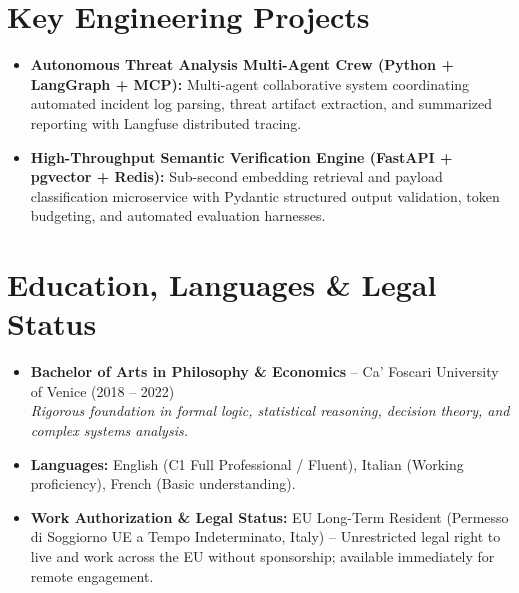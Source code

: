 \documentclass[a4paper,10pt]{article}
\begin{document}
\section{Key Engineering Projects}
\begin{itemize}
  \item \textbf{Autonomous Threat Analysis Multi-Agent Crew (Python + LangGraph + MCP):} Multi-agent collaborative system coordinating automated incident log parsing, threat artifact extraction, and summarized reporting with Langfuse distributed tracing.
  \item \textbf{High-Throughput Semantic Verification Engine (FastAPI + pgvector + Redis):} Sub-second embedding retrieval and payload classification microservice with Pydantic structured output validation, token budgeting, and automated evaluation harnesses.
\end{itemize}

\section{Education, Languages \& Legal Status}
\begin{itemize}
  \item \textbf{Bachelor of Arts in Philosophy \& Economics} -- Ca' Foscari University of Venice (2018 -- 2022) \\
  \textit{Rigorous foundation in formal logic, statistical reasoning, decision theory, and complex systems analysis.}
  \item \textbf{Languages:} English (C1 Full Professional / Fluent), Italian (Working proficiency), French (Basic understanding).
  \item \textbf{Work Authorization \& Legal Status:} EU Long-Term Resident (Permesso di Soggiorno UE a Tempo Indeterminato, Italy) -- Unrestricted legal right to live and work across the EU without sponsorship; available immediately for remote engagement.
\end{itemize}
\end{document}
